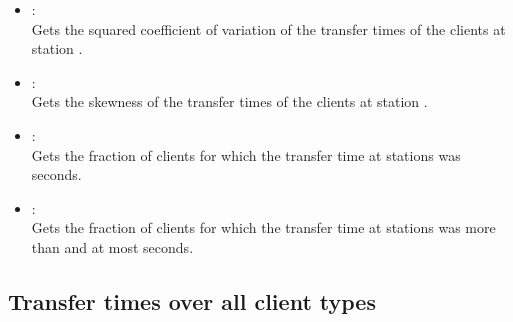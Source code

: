 \begin{itemize}
\item
{}:\\
Gets the squared coefficient of variation of the transfer times of the clients at station .

\item
{}:\\
Gets the skewness of the transfer times of the clients at station .

\item
{}:\\
Gets the fraction of clients for which the transfer time at stations  was  seconds.

\item
{}:\\
Gets the fraction of clients for which the transfer time at stations  was more than  and at most  seconds.

\end{itemize}  



\subsection{Transfer times over all client types}

